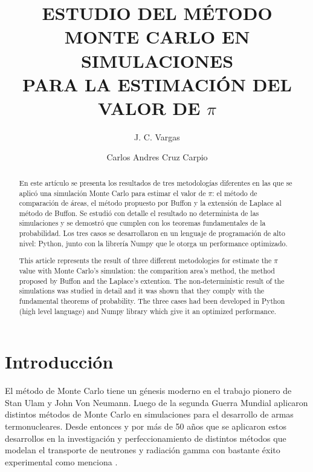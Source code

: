 \documentclass{rbf}
\begin{document}
\title{ESTUDIO DEL MÉTODO MONTE CARLO EN SIMULACIONES \\ PARA LA ESTIMACIÓN DEL VALOR DE \huge $\pi$ \normalsize}

\author{J. C. Vargas\marca{*}}


\author{Carlos Andres Cruz Carpio\marca{**}}
%


\begin{abstract}
\Resumen
En este artículo se presenta los resultados de tres metodologías diferentes en las que se aplicó una simulación Monte Carlo para estimar el valor de $\pi$: el método de comparación de áreas, el método propuesto por Buffon y la extensión de Laplace al método de Buffon. Se estudió con detalle el resultado no determinista de las simulaciones y se demostró que cumplen con los teoremas fundamentales de la probabilidad. Los tres casos se desarrollaron en un lenguaje de programación de alto nivel: Python, junto con la librería Numpy que le otorga un performance optimizado.



\Abstract
This article represents the result of three different metodologies for estimate the $\pi$ value with Monte Carlo's simulation: the comparition area's method, the method proposed by Buffon and the Laplace's extention. The non-deterministic result of the simulations was studied in detail and it was shown that they comply with the fundamental theorems of probability. The three cases had been developed in  Python (high level language) and Numpy library which give it an optimized performance. 

\end{abstract}

\maketitle


\section{Introducción}
El método de Monte Carlo tiene un génesis moderno en el trabajo pionero de Stan Ulam y John Von Neumann. Luego de la segunda Guerra Mundial aplicaron distintos métodos de Monte Carlo en simulaciones para el desarrollo de armas termonucleares. Desde entonces y por más de 50 años que se aplicaron estos desarrollos en la investigación y perfeccionamiento de distintos métodos que modelan el transporte de neutrones y radiación gamma con bastante éxito experimental como menciona \cite{biela}. 
\end{document}
